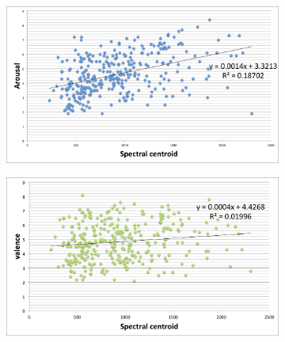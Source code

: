 \begin{figure}
        \centering
        \begin{subfigure}[b]{0.48\textwidth}
                \includegraphics[width=\textwidth]{Figures/spectralcentroid-arousal}
                \vspace{20pt}
        \end{subfigure}
        \begin{subfigure}[b]{0.48\textwidth}
                \includegraphics[width=\textwidth]{Figures/spectralcentroid-valence}
                \vspace{20pt}
        \end{subfigure}

\end{figure}
